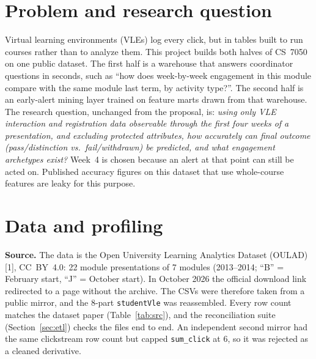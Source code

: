 \documentclass[10pt,letterpaper]{article}
\renewcommand{\tt}[1]{\texttt{#1}}
\begin{document}
\section{Problem and research question}
Virtual learning environments (VLEs) log every click, but in tables built to run courses rather than to analyze
them. This project builds both halves of CS~7050 on one public dataset. The first half is a warehouse that answers
coordinator questions in seconds, such as ``how does week-by-week engagement in this module compare with the same
module last term, by activity type?''. The second half is an early-alert mining layer trained on feature marts
drawn from that warehouse. The research question, unchanged from the proposal, is: \emph{using only VLE
interaction and registration data observable through the first four weeks of a presentation, and excluding
protected attributes, how accurately can final outcome (pass/distinction vs.\ fail/withdrawn) be predicted, and
what engagement archetypes exist?} Week~4 is chosen because an alert at that point can still be acted on.
Published accuracy figures on this dataset that use whole-course features are leaky for this purpose.

\section{Data and profiling}
\textbf{Source.} The data is the Open University Learning Analytics Dataset (OULAD) [1], CC~BY~4.0: 22 module
presentations of 7 modules (2013--2014; ``B'' = February start, ``J'' = October start). In October 2026 the
official download link redirected to a page without the archive. The CSVs were therefore taken from a public
mirror, and the 8-part \tt{studentVle} was reassembled. Every row count matches the dataset paper
(Table~\ref{tab:src}), and the reconciliation suite (Section~\ref{sec:etl}) checks the files end to end. An
independent second mirror had the same clickstream row count but capped \tt{sum\_click} at 6, so it was rejected
as a cleaned derivative.
\end{document}
